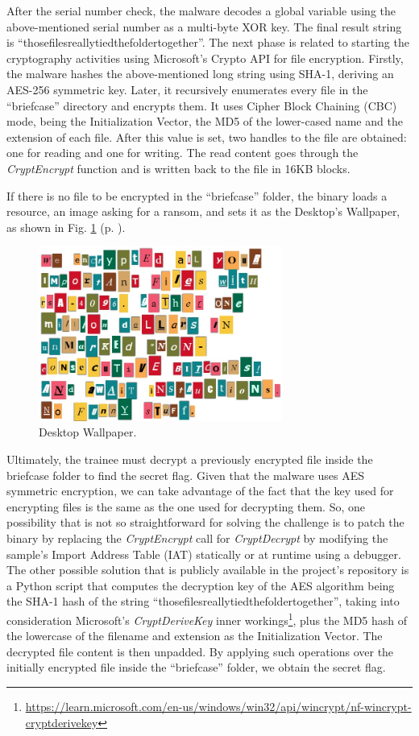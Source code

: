 After the serial number check, the malware decodes a global variable using the above-mentioned serial number as a multi-byte XOR key. The final result string is ``thosefilesreallytiedthefoldertogether''. The next phase is related to starting the cryptography activities using Microsoft's Crypto API for file encryption. Firstly, the malware hashes the above-mentioned long string using SHA-1, deriving an AES-256 symmetric key. Later, it recursively enumerates every file in the ``briefcase'' directory and encrypts them. It uses Cipher Block Chaining (CBC) mode, being the Initialization Vector, the MD5 of the lower-cased name and the extension of each file. After this value is set, two handles to the file are obtained: one for reading and one for writing. The read content goes through the \textit{CryptEncrypt} function and is written back to the file in 16KB blocks.

If there is no file to be encrypted in the ``briefcase'' folder, the binary loads a resource, an image asking for a ransom, and sets it as the Desktop's Wallpaper, as shown in Fig. \ref{fig:ida_5} (p. \pageref{fig:ida_5}).

\begin{figure}[H]
    \includegraphics[width=8cm]{figures/ida_5.png}
    \caption{Desktop Wallpaper.}
    \label{fig:ida_5}
\end{figure}

Ultimately, the trainee must decrypt a previously encrypted file inside the briefcase folder to find the secret flag. Given that the malware uses AES symmetric encryption, we can take advantage of the fact that the key used for encrypting files is the same as the one used for decrypting them. So, one possibility that is not so straightforward for solving the challenge is to patch the binary by replacing the \textit{CryptEncrypt} call for \textit{CryptDecrypt} by modifying the sample's Import Address Table (IAT) statically or at runtime using a debugger. The other possible solution that is publicly available in the project's repository is a Python script that computes the decryption key of the AES algorithm being the SHA-1 hash of the string ``thosefilesreallytiedthefoldertogether'', taking into consideration Microsoft's \textit{CryptDeriveKey} inner workings\footnote{\url{https://learn.microsoft.com/en-us/windows/win32/api/wincrypt/nf-wincrypt-cryptderivekey}}, plus the MD5 hash of the lowercase of the filename and extension as the Initialization Vector. The decrypted file content is then unpadded. By applying such operations over the initially encrypted file inside the ``briefcase'' folder, we obtain the secret flag.

